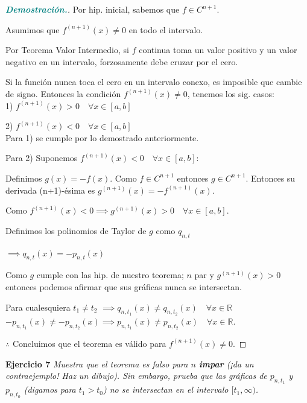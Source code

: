 \documentclass[12pt, letterpaper]{article}
\begin{document}
\begin{proof}[\textbf{\textcolor{teal}{Demostración.}}]
    Por hip. inicial, sabemos que $f \in C^{n+1}$.
    
    Asumimos que $f^{(n+1)}(x) \neq 0$ en todo el intervalo.
    
    Por Teorema Valor Intermedio, si $f$ continua toma un valor positivo y un valor negativo en un intervalo, forzosamente debe cruzar por el cero.
    
    Si la función nunca toca el cero en un intervalo conexo, es imposible que cambie de signo.
    Entonces la condición $f^{(n+1)}(x) \neq 0$, tenemos los sig. casos:\\
    
    1) $f^{(n+1)}(x) > 0 \quad \forall x \in [a,b]$
    
    2) $f^{(n+1)}(x) < 0 \quad \forall x \in [a,b]$\\
    
    Para 1) se cumple por lo demostrado anteriormente.
    
    Para 2) Suponemos $f^{(n+1)}(x) < 0 \quad \forall x \in [a,b]$:
    
    Definimos $g(x) = -f(x)$. Como $f \in C^{n+1}$ entonces $g \in C^{n+1}$.
    Entonces su derivada (n+1)-ésima es $g^{(n+1)}(x) = -f^{(n+1)}(x)$.
    
    Como $f^{(n+1)}(x) < 0 \implies g^{(n+1)}(x) > 0 \quad \forall x \in [a,b]$.
    
    Definimos los polinomios de Taylor de $g$ como $q_{n,t}$
    
    $\implies q_{n,t}(x) = -p_{n,t}(x)$
    
    Como $g$ cumple con las hip. de nuestro teorema; $n$ par y $g^{(n+1)}(x) > 0$ entonces podemos afirmar que sus gráficas nunca se intersectan.
    
    Para cualesquiera $t_1 \neq t_2$
    $\implies q_{n,t_1}(x) \neq q_{n,t_2}(x) \quad \forall x \in \mathbb{R}$
    $-p_{n,t_1}(x) \neq -p_{n,t_2}(x) \implies p_{n,t_1}(x) \neq p_{n,t_2}(x) \quad \forall x \in \mathbb{R}$.
    
    $\therefore$ Concluimos que el teorema es válido para $f^{(n+1)}(x) \neq 0$.
\end{proof}

\vspace{0.4cm}
\noindent \textbf{Ejercicio 7} \textit{Muestra que el teorema es falso para $n$ \textbf{impar} (¡da un contraejemplo! Haz un dibujo). Sin embargo, prueba que las gráficas de $p_{n,t_1}$ y $p_{n,t_0}$ (digamos para $t_1 > t_0$) no se intersectan en el intervalo $[t_1, \infty)$.}
\end{document}
